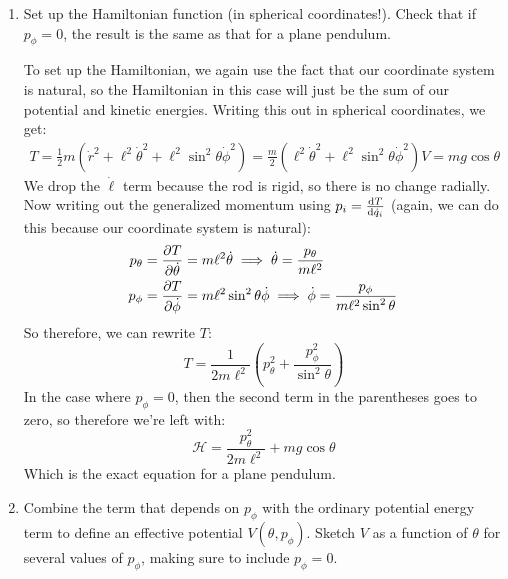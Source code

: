 \documentclass[10pt]{article}
\begin{document}
	\begin{enumerate}[label=\alph*)]
		\item Set up the Hamiltonian function (in spherical coordinates!). Check that if $p_\phi = 0$, the
			result is the same as that for a plane pendulum. 

			\begin{solution}
				To set up the Hamiltonian, we again use the fact that our coordinate system is natural, so the 
				Hamiltonian in this case will just be the sum of our potential and kinetic energies. Writing
				this out in spherical coordinates, we get: 
				\begin{align*}
					T = \frac{1}{2}m(\dot r^2 + \ell^2 \dot \theta^2 + \ell^2 \sin^2 \theta \dot \phi^2) = \frac{m}{2}\left( \ell^2 \dot \theta^2 + \ell^2 \sin^2 \theta \dot \phi^2 \right) 
					V = mg \cos \theta
				\end{align*}
				We drop the $\dot \ell$ term because the rod is rigid, so there is no change radially. Now
				writing out the generalized momentum using $p_i = \dv{T}{\dot q_i}$ (again, we can do this
				because our coordinate system is natural):
				\begin{align*}
					p_{\theta} &= \pdv{T}{\dot \theta} = m \ell^2 \dot \theta  \implies \dot \theta 
					= \frac{p_\theta}{m\ell^2}\\
					p_{\phi} &= \pdv{T}{\dot \phi} = m\ell^2 \sin^2 \theta \dot \phi \implies \dot \phi = \frac{p_\phi}{m\ell^2 \sin^2 \theta} 
				\end{align*}
				So therefore, we can rewrite $T$:
				\[
					T = \frac{1}{2m\ell^2}\left( p_\theta^2 + \frac{p_\phi^2}{\sin^2 \theta} \right) 
				\] 
				In the case where $p_\phi = 0$, then the second term in the parentheses goes to zero, so 
				therefore we're left with: 
				\[
					\mathcal H = \frac{p_\theta^2}{2m\ell^2} + mg \cos \theta
				\] 
				Which is the exact equation for a plane pendulum. 
			\end{solution}
		\item Combine the term that depends on $p_\phi$ with the ordinary potential energy term to define an 
			effective potential $V(\theta, p_\phi)$. Sketch $V$ as a function of $\theta$ for several values of 
			$p_\phi$, making sure to include $p_\phi = 0$.



\end{enumerate}
\end{document}
